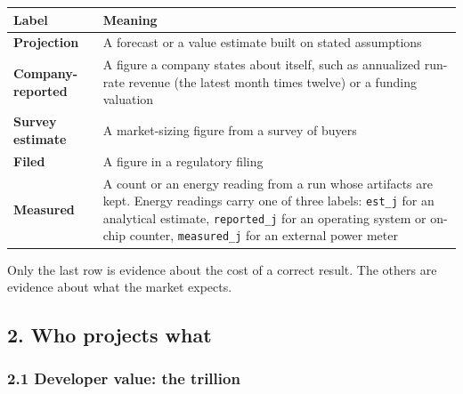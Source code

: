 \documentclass[
  10pt,
]{article}
\newcounter{none} %
\begin{document}
{\def\LTcaptype{none} %
\begin{longtable}[]{@{}
  >{\raggedright\arraybackslash}p{}
  >{\raggedright\arraybackslash}p{}@{}}
\toprule\noalign{}
\begin{minipage}[b]{\linewidth}\raggedright
Label
\end{minipage} & \begin{minipage}[b]{\linewidth}\raggedright
Meaning
\end{minipage} \\
\midrule\noalign{}
\endhead
\bottomrule\noalign{}
\endlastfoot
\textbf{Projection} & A forecast or a value estimate built on stated
assumptions \\
\textbf{Company-reported} & A figure a company states about itself, such
as annualized run-rate revenue (the latest month times twelve) or a
funding valuation \\
\textbf{Survey estimate} & A market-sizing figure from a survey of
buyers \\
\textbf{Filed} & A figure in a regulatory filing \\
\textbf{Measured} & A count or an energy reading from a run whose
artifacts are kept. Energy readings carry one of three labels:
\texttt{est\_j} for an analytical estimate, \texttt{reported\_j} for an
operating system or on-chip counter, \texttt{measured\_j} for an
external power meter \\
\end{longtable}
}

Only the last row is evidence about the cost of a correct result. The
others are evidence about what the market expects.

\subsection{2. Who projects what}\label{who-projects-what}

\subsubsection{2.1 Developer value: the
trillion}\label{developer-value-the-trillion}
\end{document}

